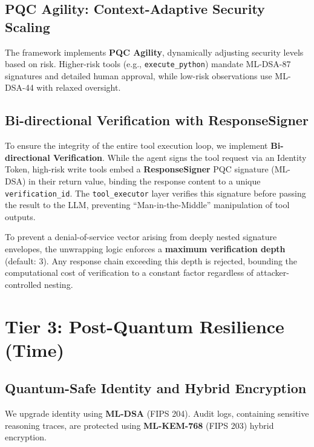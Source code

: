\documentclass[conference]{IEEEtran}
\begin{document}
\subsection{PQC Agility: Context-Adaptive Security Scaling}
The framework implements \textbf{PQC Agility}, dynamically adjusting security levels based on risk. Higher-risk tools (e.g., \texttt{execute\_python}) mandate ML-DSA-87 signatures and detailed human approval, while low-risk observations use ML-DSA-44 with relaxed oversight.

\subsection{Bi-directional Verification with ResponseSigner}
To ensure the integrity of the entire tool execution loop, we implement \textbf{Bi-directional Verification}. While the agent signs the tool request via an Identity Token, high-risk write tools embed a \textbf{ResponseSigner} PQC signature (ML-DSA) in their return value, binding the response content to a unique \texttt{verification\_id}. The \texttt{tool\_executor} layer verifies this signature before passing the result to the LLM, preventing ``Man-in-the-Middle'' manipulation of tool outputs.

To prevent a denial-of-service vector arising from deeply nested signature envelopes, the unwrapping logic enforces a \textbf{maximum verification depth} (default: 3). Any response chain exceeding this depth is rejected, bounding the computational cost of verification to a constant factor regardless of attacker-controlled nesting.

\section{Tier 3: Post-Quantum Resilience (Time)}
\subsection{Quantum-Safe Identity and Hybrid Encryption}
We upgrade identity using \textbf{ML-DSA} (FIPS 204). Audit logs, containing sensitive reasoning traces, are protected using \textbf{ML-KEM-768} (FIPS 203) hybrid encryption.
\end{document}
